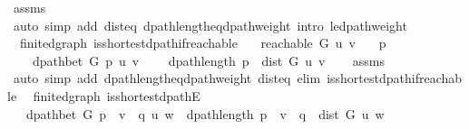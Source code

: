 \begin{isabellebody}
\ assms\isanewline
\ \ \isamarkupfalse%
\ {\isacharparenleft}{\kern0pt}auto\ simp\ add{\isacharcolon}{\kern0pt}\ dist{\isacharunderscore}{\kern0pt}eq{\isacharunderscore}{\kern0pt}{\isasymdelta}\ dpath{\isacharunderscore}{\kern0pt}length{\isacharunderscore}{\kern0pt}eq{\isacharunderscore}{\kern0pt}dpath{\isacharunderscore}{\kern0pt}weight\ intro{\isacharcolon}{\kern0pt}\ {\isasymdelta}{\isacharunderscore}{\kern0pt}le{\isacharunderscore}{\kern0pt}dpath{\isacharunderscore}{\kern0pt}weight{\isacharparenright}{\kern0pt}%
\endisatagproof
{\isafoldproof}%
%
\isadelimproof
\isanewline
%
\endisadelimproof
\isanewline
{}\isamarkupfalse%
\ {\isacharparenleft}{\kern0pt}\ finite{\isacharunderscore}{\kern0pt}dgraph{\isacharparenright}{\kern0pt}\ is{\isacharunderscore}{\kern0pt}shortest{\isacharunderscore}{\kern0pt}dpath{\isacharunderscore}{\kern0pt}if{\isacharunderscore}{\kern0pt}reachable{\isacharunderscore}{\kern0pt}{}{\isacharcolon}{\kern0pt}\isanewline
\ \ \ {\isachardoublequoteopen}reachable\ G\ u\ v{\isachardoublequoteclose}\isanewline
\ \ \ p\ \isanewline
\ \ \ \ {\isachardoublequoteopen}dpath{\isacharunderscore}{\kern0pt}bet\ G\ p\ u\ v{\isachardoublequoteclose}\isanewline
\ \ \ \ {\isachardoublequoteopen}dpath{\isacharunderscore}{\kern0pt}length\ p\ {\isacharequal}{\kern0pt}\ dist\ G\ u\ v{\isachardoublequoteclose}\isanewline
%
\isadelimproof
\ \ %
\endisadelimproof
%
\isatagproof
{}\isamarkupfalse%
\ assms\isanewline
\ \ \isamarkupfalse%
\ {\isacharparenleft}{\kern0pt}auto\ simp\ add{\isacharcolon}{\kern0pt}\ dpath{\isacharunderscore}{\kern0pt}length{\isacharunderscore}{\kern0pt}eq{\isacharunderscore}{\kern0pt}dpath{\isacharunderscore}{\kern0pt}weight\ dist{\isacharunderscore}{\kern0pt}eq{\isacharunderscore}{\kern0pt}{\isasymdelta}\ elim{\isacharcolon}{\kern0pt}\ is{\isacharunderscore}{\kern0pt}shortest{\isacharunderscore}{\kern0pt}dpath{\isacharunderscore}{\kern0pt}if{\isacharunderscore}{\kern0pt}reachable{\isacharparenright}{\kern0pt}%
\endisatagproof
{\isafoldproof}%
%
\isadelimproof
\isanewline
%
\endisadelimproof
\isanewline
{}\isamarkupfalse%
\ {\isacharparenleft}{\kern0pt}\ finite{\isacharunderscore}{\kern0pt}dgraph{\isacharparenright}{\kern0pt}\ is{\isacharunderscore}{\kern0pt}shortest{\isacharunderscore}{\kern0pt}dpathE{\isacharunderscore}{\kern0pt}{}{\isacharcolon}{\kern0pt}\isanewline
\ \ \ {\isachardoublequoteopen}dpath{\isacharunderscore}{\kern0pt}bet\ G\ {\isacharparenleft}{\kern0pt}p\ {\isacharat}{\kern0pt}\ {\isacharbrackleft}{\kern0pt}v{\isacharbrackright}{\kern0pt}\ {\isacharat}{\kern0pt}\ q{\isacharparenright}{\kern0pt}\ u\ w\ {\isasymand}\ dpath{\isacharunderscore}{\kern0pt}length\ {\isacharparenleft}{\kern0pt}p\ {\isacharat}{\kern0pt}\ {\isacharbrackleft}{\kern0pt}v{\isacharbrackright}{\kern0pt}\ {\isacharat}{\kern0pt}\ q{\isacharparenright}{\kern0pt}\ {\isacharequal}{\kern0pt}\ dist\ G\ u\ w{\isachardoublequoteclose}\isanewline

\end{isabellebody}
